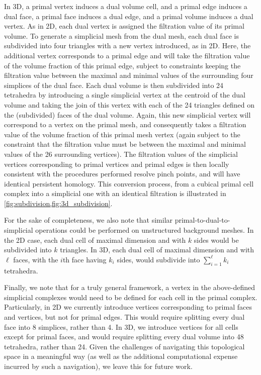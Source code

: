 In 3D, a primal vertex induces a dual volume cell, and a primal edge induces a dual face, a primal face induces a dual edge, and a primal volume induces a dual vertex.
As in 2D, each dual vertex is assigned the filtration value of its primal volume.
To generate a simplicial mesh from the dual mesh, each dual face is subdivided into four triangles with a new vertex introduced, as in 2D.
Here, the additional vertex corresponds to a primal edge and will take the filtration value of the volume fraction of this primal edge, subject to constraints keeping the filtration value between the maximal and minimal values of the surrounding four simplices of the dual face.
Each dual volume is then subdivided into 24 tetrahedra by introducing a single simplicial vertex at the centroid of the dual volume and taking the join of this vertex with each of the 24 triangles defined on the (subdivided) faces of the dual volume.
Again, this new simplicial vertex will correspond to a vertex on the primal mesh, and consequently takes a filtration value of the volume fraction of this primal mesh vertex (again subject to the constraint that the filtration value must be between the maximal and minimal values of the 26 surrounding vertices).
The filtration values of the simplicial vertices corresponding to primal vertices and primal edges is then locally consistent with the procedures performed resolve pinch points, and will have identical persistent homology.
%
This conversion process, from a cubical primal cell complex into a simplicial one with an identical filtration is illustrated in \cref{fig:subdivision,fig:3d_subdivision}.

For the sake of completeness, we also note that similar primal-to-dual-to-simplicial operations could be performed on unstructured background meshes.
In the 2D case, each dual cell of maximal dimension and with $k$ sides would be subdivided into $k$ triangles.
In 3D, each dual cell of maximal dimension and with $\ell$ faces,  with the $i$th face having $k_i$ sides, would subdivide into $\sum_{i=1}^\ell k_i$ tetrahedra.

Finally, we note that for a truly general framework, a vertex in the above-defined simplicial complexes would need to be defined for each cell in the primal complex.
Particularly, in 2D we currently introduce vertices corresponding to primal faces and vertices, but not for primal edges.
This would require splitting every dual face into 8 simplices, rather than 4.
In 3D, we introduce vertices for all cells except for primal faces, and would require splitting every dual volume into 48 tetrahedra, rather than 24.
Given the challenges of navigating this topological space in a meaningful way (as well as the additional computational expense incurred by such a navigation), we leave this for future work.





